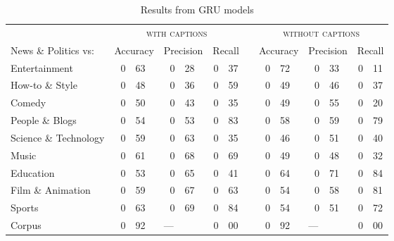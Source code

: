 \documentclass[letterpaper, 12pt]{article}
\begin{document}
\begin{table}[H]
  \centering
  \caption*{Results from GRU models}
  \begin{tabular}{lr@{.}lr@{.}lr@{.}lp{1em}r@{.}lr@{.}lr@{.}l}
    \toprule
    & \multicolumn{6}{c}{\textsc{with captions}} & & \multicolumn{6}{c}{\textsc{without captions}} \\
    \cmidrule{2-7} \cmidrule{9-14}
    News \& Politics vs: & \multicolumn{2}{r}{Accuracy} & \multicolumn{2}{r}{Precision} & \multicolumn{2}{r}{Recall} & & \multicolumn{2}{r}{Accuracy} & \multicolumn{2}{r}{Precision} & \multicolumn{2}{r}{Recall} \\
    \midrule
    Entertainment         & 0 & 63  &	0 & 28                  &	0 & 37 & & 0 & 72 &	0 & 33 &	0 & 11 \\
    How-to \& Style       & 0 & 48	& 0 & 36                  &	0 & 59 & & 0 & 49 &	0 & 46 &	0 & 37 \\
    Comedy                & 0 & 50  &	0 & 43                  &	0 & 35 & & 0 & 49 &	0 & 55 &	0 & 20 \\
    People \& Blogs       & 0 & 54  & 0 & 53                  &	0 & 83 & & 0 & 58 &	0 & 59 &	0 & 79 \\
    Science \& Technology & 0 & 59	& 0 & 63                  & 0 & 35 & & 0 & 46 &	0 & 51 &	0 & 40 \\
    Music                 & 0 & 61  & 0 & 68                  &	0 & 69 & & 0 & 49 &	0 & 48 &	0 & 32 \\
    Education             & 0 & 53  &	0 & 65                  &	0 & 41 & & 0 & 64 &	0 & 71 &	0 & 84 \\
    Film \& Animation     & 0 & 59  &	0 & 67                  &	0 & 63 & & 0 & 54 &	0 & 58 &	0 & 81 \\
    Sports                & 0 & 63  &	0 & 69                  &	0 & 84 & & 0 & 54 &	0 & 51 &	0 & 72 \\
    \bottomrule
    Corpus                & 0 & 92  & \multicolumn{2}{l}{---} & 0 & 00 & & 0 & 92 & \multicolumn{2}{l}{---} &	0 & 00 \\
  \end{tabular}
\end{table}
\end{document}
